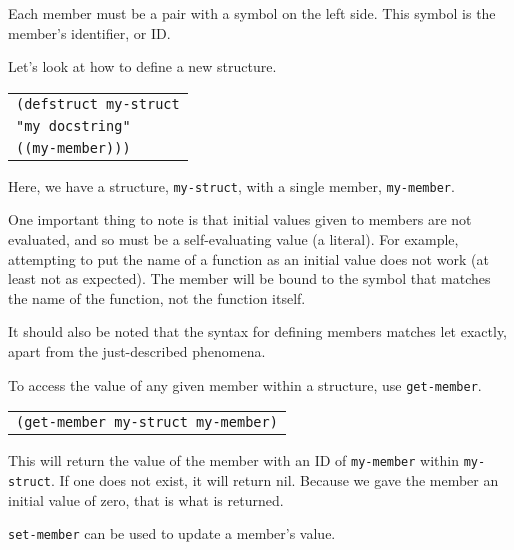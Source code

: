 \documentclass[
letterpaper,
oneside,
]{memoir}
\begin{document}
\vspace{1em}
\noindent
Each member must be a pair with a symbol on the left side. This symbol is the member’s identifier, or ID.

\vspace{1em}
\noindent
Let’s look at how to define a new structure.

\vspace{1em}
\begin{tabular}{l}
  \verb|(defstruct my-struct| \\
  \qquad\verb|"my docstring"| \\
  \qquad\verb|((my-member)))| \\
\end{tabular}
\vspace{1em}

\noindent
Here, we have a structure, \texttt{my-struct}, with a single member, \texttt{my-member}.

\vspace{1em}
\noindent
One important thing to note is that initial values given to members are not evaluated, and so must be a self-evaluating value (a literal). For example, attempting to put the name of a function as an initial value does not work (at least not as expected). The member will be bound to the symbol that matches the name of the function, not the function itself.

\vspace{1em}
\noindent
It should also be noted that the syntax for defining members matches let exactly, apart from the just-described phenomena.

\filbreak

\vspace{1em}
\noindent
To access the value of any given member within a structure, use \texttt{get-member}.

\vspace{1em}
\begin{tabular}{l}
  \texttt{(get-member my-struct my-member)} \\
\end{tabular}
\vspace{1em}

\noindent
This will return the value of the member with an ID of \texttt{my-member} within \texttt{my-struct}. If one does not exist, it will return nil. Because we gave the member an initial value of zero, that is what is returned.

\filbreak

\vspace{1em}
\noindent
\texttt{set-member} can be used to update a member’s value.
\end{document}
